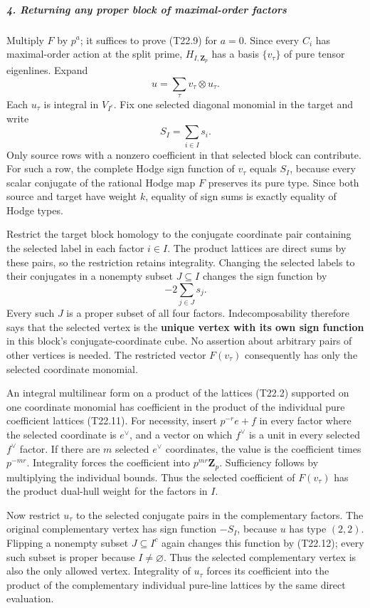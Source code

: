 \documentclass[11pt,a4paper]{article}
\theoremstyle{definition}
\begin{document}
\subparagraph{4. Returning any proper block of maximal-order factors}\label{returning-any-proper-block-of-maximal-order-factors}

Multiply \(F\) by \(p^a\); it suffices to prove (T22.9) for \(a=0\). Since every \(C_i\) has maximal-order action at the split prime, \(H_{I,\mathbf Z_p}\) has a basis \(\{v_\tau\}\) of pure tensor eigenlines. Expand \[
 u=\sum_\tau v_\tau\otimes u_\tau .
\] Each \(u_\tau\) is integral in \(V_{I^c}\). Fix one selected diagonal monomial in the target and write \[
 S_I=\sum_{i\in I}s_i.
\] Only source rows with a nonzero coefficient in that selected block can contribute. For such a row, the complete Hodge sign function of \(v_\tau\) equals \(S_I\), because every scalar conjugate of the rational Hodge map \(F\) preserves its pure type. Since both source and target have weight \(k\), equality of sign sums is exactly equality of Hodge types.

Restrict the target block homology to the conjugate coordinate pair containing the selected label in each factor \(i\in I\). The product lattices are direct sums by these pairs, so the restriction retains integrality. Changing the selected labels to their conjugates in a nonempty subset \(J\subseteq I\) changes the sign function by \[
 -2\sum_{j\in J}s_j.
 \tag{T22.12}
\] Every such \(J\) is a proper subset of all four factors. Indecomposability therefore says that the selected vertex is the \textbf{unique vertex with its own sign function} in this block's conjugate-coordinate cube. No assertion about arbitrary pairs of other vertices is needed. The restricted vector \(F(v_\tau)\) consequently has only the selected coordinate monomial.

An integral multilinear form on a product of the lattices (T22.2) supported on one coordinate monomial has coefficient in the product of the individual pure coefficient lattices (T22.11). For necessity, insert \(p^{-r}e+f\) in every factor where the selected coordinate is \(e^\vee\), and a vector on which \(f^\vee\) is a unit in every selected \(f^\vee\) factor. If there are \(m\) selected \(e^\vee\) coordinates, the value is the coefficient times \(p^{-mr}\). Integrality forces the coefficient into \(p^{mr}\mathbf Z_p\). Sufficiency follows by multiplying the individual bounds. Thus the selected coefficient of \(F(v_\tau)\) has the product dual-hull weight for the factors in \(I\).

Now restrict \(u_\tau\) to the selected conjugate pairs in the complementary factors. The original complementary vertex has sign function \(-S_I\), because \(u\) has type \((2,2)\). Flipping a nonempty subset \(J\subseteq I^c\) again changes this function by (T22.12); every such subset is proper because \(I\ne\varnothing\). Thus the selected complementary vertex is also the only allowed vertex. Integrality of \(u_\tau\) forces its coefficient into the product of the complementary individual pure-line lattices by the same direct evaluation.
\end{document}

